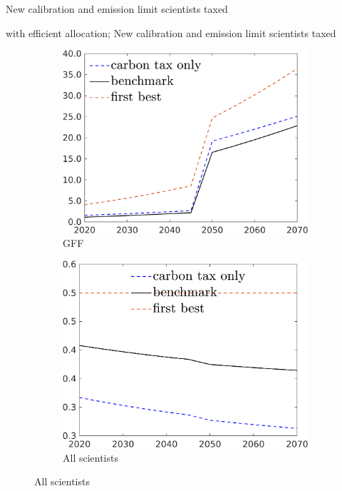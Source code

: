 \documentclass[11pt,aspectratio=169]{beamer}
\begin{document}
\begin{frame}{New calibration and emission limit scientists taxed}
\begin{figure}[h!!]
\begin{subfigure}{0.4\textwidth}
		\end{subfigure}
	\end{figure}
\end{frame}


\begin{frame}{with efficient allocation; New calibration and emission limit scientists taxed}
	\begin{figure}[h!!]
		\centering
		\begin{subfigure}{0.3\textwidth}		
			\caption{{GFF}}
			\includegraphics[width=1\textwidth]{../codding_model/own_basedOnFried/optimalPol_010922_revision/figures/all_13Sept22/NewCalib_eff2pol_T_GFF_Sun2_emnet1_spillover0_knspil3_xgr0_nsk0_sep0_extern0_PV1_etaa0.79_lgd1.png}
		\end{subfigure}
		\begin{subfigure}{0.3\textwidth}		
			\caption{{All scientists}}
			\includegraphics[width=1\textwidth]{../codding_model/own_basedOnFried/optimalPol_010922_revision/figures/all_13Sept22/NewCalib_eff2pol_T_S_Sun2_emnet1_spillover0_knspil3_xgr0_nsk0_sep0_extern0_PV1_etaa0.79_lgd1.png}

\end{subfigure}
\end{figure}
\end{frame}
\end{document}

